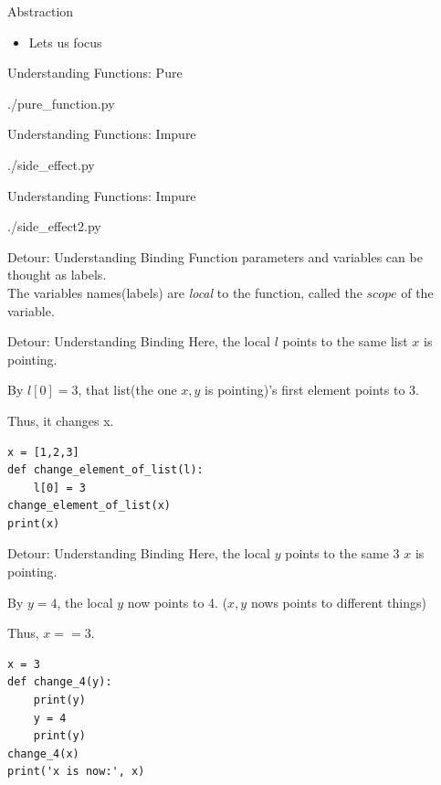 \documentclass{beamer}
\begin{document}
\begin{frame}{Abstraction}
  \begin{itemize}
    \item Lets us focus
  \end{itemize}
\end{frame}

\begin{frame}{Understanding Functions: Pure}
  \begin{lstinputlisting}
    {./pure_function.py}
  \end{lstinputlisting}
\end{frame}

\begin{frame}{Understanding Functions: Impure}
  \begin{lstinputlisting}
    {./side_effect.py}
  \end{lstinputlisting}
\end{frame}

\begin{frame}{Understanding Functions: Impure}
  \begin{lstinputlisting}
    {./side_effect2.py}
  \end{lstinputlisting}
\end{frame}

\begin{frame}{Detour: Understanding Binding}
  Function parameters and variables can be thought as labels.\\

  The variables names(labels) are \textit{local} to the function,
  called the $scope$ of the variable.
\end{frame}

\begin{frame}[fragile]{Detour: Understanding Binding}
  Here, the local $l$ points to the same list $x$ is pointing.

  By $l[0]=3$, that list(the one $x,y$ is pointing)'s first element points to 3.

  Thus, it changes x.
  \begin{lstlisting}
x = [1,2,3]
def change_element_of_list(l):
    l[0] = 3
change_element_of_list(x)
print(x)
  \end{lstlisting}
\end{frame}

\begin{frame}[fragile]{Detour: Understanding Binding}
  Here, the local $y$ points to the same 3 $x$ is pointing.

  By $y = 4$, the local $y$ now points to 4.
  ($x, y$ nows points to different things)

  Thus, $x==3$.
  \begin{lstlisting}
x = 3
def change_4(y):
    print(y)
    y = 4
    print(y)
change_4(x)
print('x is now:', x)
  \end{lstlisting}
\end{frame}
\end{document}
